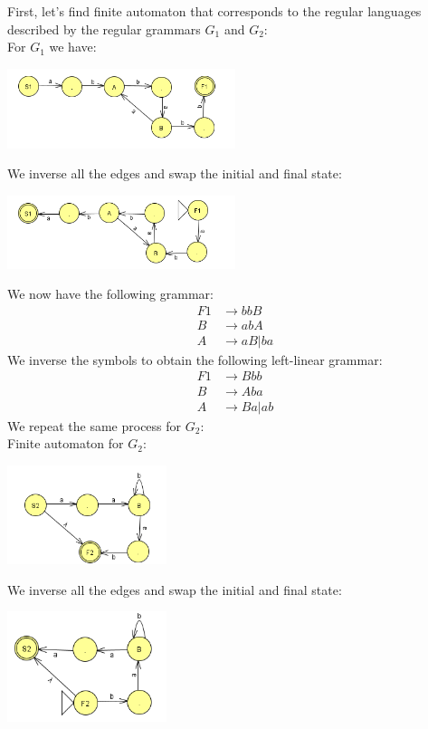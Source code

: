 \noindent First, let's find finite automaton that corresponds to the regular languages described by the regular grammars $G_1$ and $G_2$:\\
For $G_1$ we have:
\begin{center}
    \includegraphics[width=0.5\textwidth]{img/graph9.png}
\end{center}
\noindent We inverse all the edges and swap the initial and final state:
\begin{center}
    \includegraphics[width=0.5\textwidth]{img/graph10.png}
\end{center}
\noindent We now have the following grammar:
\begin{align*}
    F1 &\rightarrow bbB\\
    B &\rightarrow abA\\
    A &\rightarrow aB | ba
\end{align*}
\noindent We inverse the symbols to obtain the following left-linear grammar:
\begin{align*}
    F1 &\rightarrow Bbb\\
    B &\rightarrow Aba\\
    A &\rightarrow Ba | ab
\end{align*}
\newpage
\noindent We repeat the same process for $G_2$:\\ Finite automaton for $G_2$:
\begin{center}
    \includegraphics[width=0.35\textwidth]{img/graph11.png}
\end{center}
\noindent We inverse all the edges and swap the initial and final state:
\begin{center}
    \includegraphics[width=0.35\textwidth]{img/graph12.png}
\end{center}
